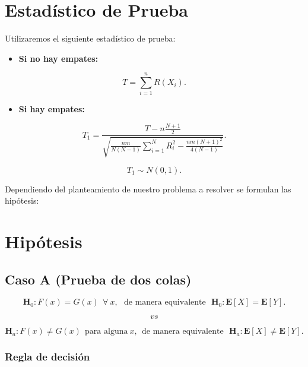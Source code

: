 \documentclass[
  a4paper,
  oneside,
  openany]{book}
\providecommand{\tightlist}{%
  \setlength{\itemsep}{0pt}\setlength{\parskip}{0pt}}
\begin{document}
\hypertarget{estaduxedstico-de-prueba-5}{%
\section{Estadístico de Prueba}\label{estaduxedstico-de-prueba-5}}

Utilizaremos el siguiente estadístico de prueba:

\begin{itemize}
\tightlist
\item
  \textbf{Si no hay empates:}
\end{itemize}

\[T=\sum_{i=1}^{n}R(X_{i}).\]

\begin{itemize}
\tightlist
\item
  \textbf{Si hay empates:}
\end{itemize}

\[T_1= \frac{T-n\frac{N+1}{2}}{\sqrt{\frac{nm}{N(N-1)}\sum_{i=1}^{N}R_i^2-\frac{nm(N+1)^2}{4(N-1)}}}.\]

\[T_{1}\sim N(0,1).\]

Dependiendo del planteamiento de nuestro problema a resolver se formulan las hipótesis:

\hypertarget{hipuxf3tesis-5}{%
\section{Hipótesis}\label{hipuxf3tesis-5}}

\hypertarget{caso-a-prueba-de-dos-colas-5}{%
\subsection*{Caso A (Prueba de dos colas)}\label{caso-a-prueba-de-dos-colas-5}}


\[\textbf{H}_0: F(x) = G(x) \ \  \forall\ x, \ \ \  \mbox{de manera equivalente} \ \ \  \textbf{H}_0:\mathbf{E}[X] = \mathbf{E}[Y].\]

\[vs\]

\[\textbf{H}_a: F(x) \neq G(x) \ \ \mbox{para alguna} \ x,  \ \ \mbox{de manera equivalente} \ \ \  \textbf{H}_a:
\mathbf{E}[X] \neq \mathbf{E}[Y].\]

\hypertarget{regla-de-decisiuxf3n-13}{%
\subsubsection*{Regla de decisión}\label{regla-de-decisiuxf3n-13}}
\end{document}

